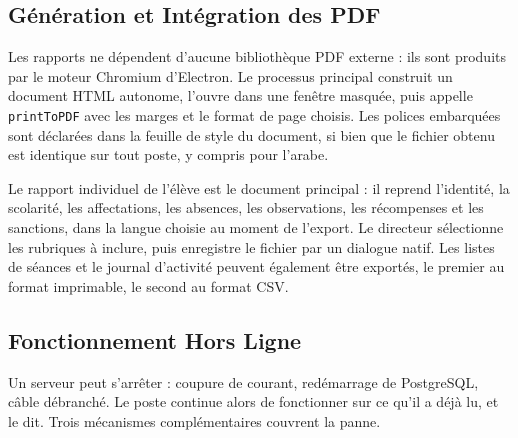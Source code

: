 \subsection{Génération et Intégration des PDF}
Les rapports ne dépendent d'aucune bibliothèque \ac{PDF} externe : ils sont produits par le moteur
Chromium d'Electron. Le processus principal construit un document \ac{HTML} autonome, l'ouvre dans une
fenêtre masquée, puis appelle \texttt{printToPDF} avec les marges et le format de page choisis. Les
polices embarquées sont déclarées dans la feuille de style du document, si bien que le fichier obtenu
est identique sur tout poste, y compris pour l'arabe.

Le rapport individuel de l'élève est le document principal : il reprend l'identité, la scolarité, les
affectations, les absences, les observations, les récompenses et les sanctions, dans la langue choisie
au moment de l'export. Le directeur sélectionne les rubriques à inclure, puis enregistre le fichier par
un dialogue natif. Les listes de séances et le journal d'activité peuvent également être exportés, le
premier au format imprimable, le second au format \ac{CSV}.

\subsection{Fonctionnement Hors Ligne}
Un serveur peut s'arrêter : coupure de courant, redémarrage de PostgreSQL, câble débranché. Le poste
continue alors de fonctionner sur ce qu'il a déjà lu, et le dit. Trois mécanismes complémentaires
couvrent la panne.

